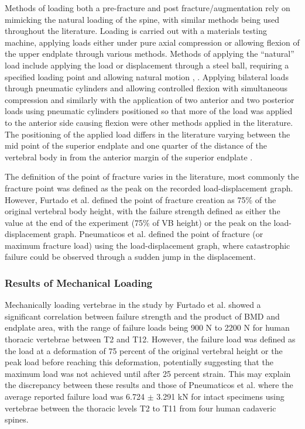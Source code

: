 Methods of loading both a pre-fracture and post fracture/augmentation
rely on mimicking the natural loading of the spine, with similar methods
being used throughout the literature. Loading is carried out with a
materials testing machine, applying loads either under pure axial
compression or allowing flexion of the upper endplate through various
methods. Methods of applying the ``natural'' load include applying the
load or displacement through a steel ball, requiring a specified loading
point and allowing natural motion \cite{tarsuslugil2013development},
\cite{furtado2007biomechanical}.
Applying bilateral
loads through pneumatic cylinders and allowing controlled flexion with
simultaneous compression \cite{ananthakrishnan2005effect} and similarly with
the application of
two anterior and two posterior loads using pneumatic cylinders
positioned so that more of the load was applied to the anterior side
causing flexion \cite{pneumaticos2013effect} were other methods applied in the
literature.
The positioning of the applied load differs in the literature varying
between the mid point of the superior endplate \cite{Barr2000} and one quarter
of the distance of the vertebral body in from the anterior margin of the
superior endplate \cite{belkoff2001biomechanics}.

The definition of the point of fracture varies in the literature, most
commonly the fracture point was defined as the peak on the recorded
load-displacement graph. However, Furtado et al. \cite{furtado2007biomechanical} defined the point of
fracture creation as 75\% of the original vertebral body height, with
the failure strength defined as either the value at the end of the
experiment (75\% of VB height) or the peak on the load-displacement
graph. Pneumaticos et al. \cite{pneumaticos2013effect} defined the point of
fracture (or
maximum fracture load) using the load-displacement graph, where
catastrophic failure could be observed through a sudden jump in the
displacement.

\subsubsection{Results of Mechanical Loading
}\label{results-of-mechanical-loading}

Mechanically loading vertebrae in the study by Furtado et al. \cite{furtado2007biomechanical} showed a
significant correlation between failure strength and the product of BMD
and endplate area, with the range of failure loads being 900 N to 2200 N
for human thoracic vertebrae between T2 and T12. However, the failure
load was defined as the load at a deformation of 75 percent of the
original vertebral height or the peak load before reaching this
deformation, potentially suggesting that the maximum load was not
achieved until after 25 percent strain. This may explain the discrepancy
between these results and those of Pneumaticos et al.
\cite{pneumaticos2013effect} where the
average reported failure load was 6.724 $\pm$ 3.291 kN for intact specimens
using vertebrae between the thoracic levels T2 to T11 from four human
cadaveric spines.

